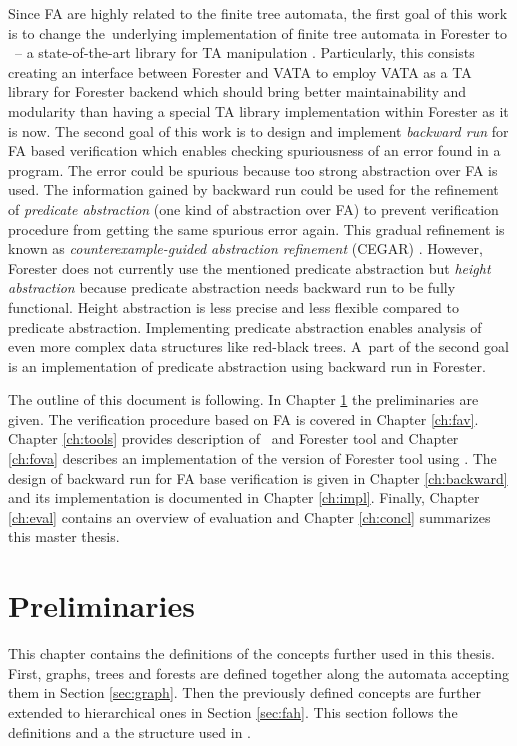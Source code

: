 Since FA are highly related to the finite tree automata, the first goal of this work is to change
the~underlying implementation of finite tree automata in Forester to \vata\ -- a state-of-the-art library for TA manipulation \cite{libvata}.
Particularly, this consists creating an interface between Forester and VATA to employ VATA as a TA library for Forester backend
which should bring better maintainability and modularity than having a special TA library implementation within Forester as it is now.
The second goal of this work is to design and implement \emph{backward run} for FA based verification
which enables checking spuriousness of an error found in a program.
The error could be spurious because too strong abstraction over FA is used.
The information gained by backward run could be used for the refinement of \emph{predicate abstraction} (one kind of abstraction over FA)
to prevent verification procedure from getting the same spurious error again.
This gradual refinement is known as \emph{counterexample-guided abstraction refinement} (CEGAR) \cite{cegar}.
However, Forester does not currently use the mentioned predicate abstraction but \emph{height abstraction} %
because predicate abstraction needs backward run to be fully functional.
Height abstraction is less precise and less flexible compared to predicate abstraction.
Implementing predicate abstraction enables analysis of even more complex data structures like red-black trees.
A~part of the second goal is an implementation of predicate abstraction using backward run in Forester.

The outline of this document is following.
In Chapter \ref{ch:prel} the preliminaries are given.
The verification procedure based on FA is covered in Chapter \ref{ch:fav}.
Chapter \ref{ch:tools} provides description of \vata\ and Forester tool and Chapter \ref{ch:fova} describes an implementation of the version of Forester tool using \vata.
The design of backward run for FA base verification is given in Chapter \ref{ch:backward} and its implementation is documented
in Chapter \ref{ch:impl}.
Finally,
Chapter \ref{ch:eval} contains an overview of evaluation and 
Chapter \ref{ch:concl} summarizes this master thesis.

\chapter{Preliminaries}
\label{ch:prel}

This chapter contains the definitions of the concepts further used in this thesis.
First, graphs, trees and forests are defined together along the automata accepting them in Section \ref{sec:graph}.
Then the previously defined concepts are further extended to hierarchical ones in Section \ref{sec:fah}.
This section follows the definitions and a the structure used in \cite{techrep}.

